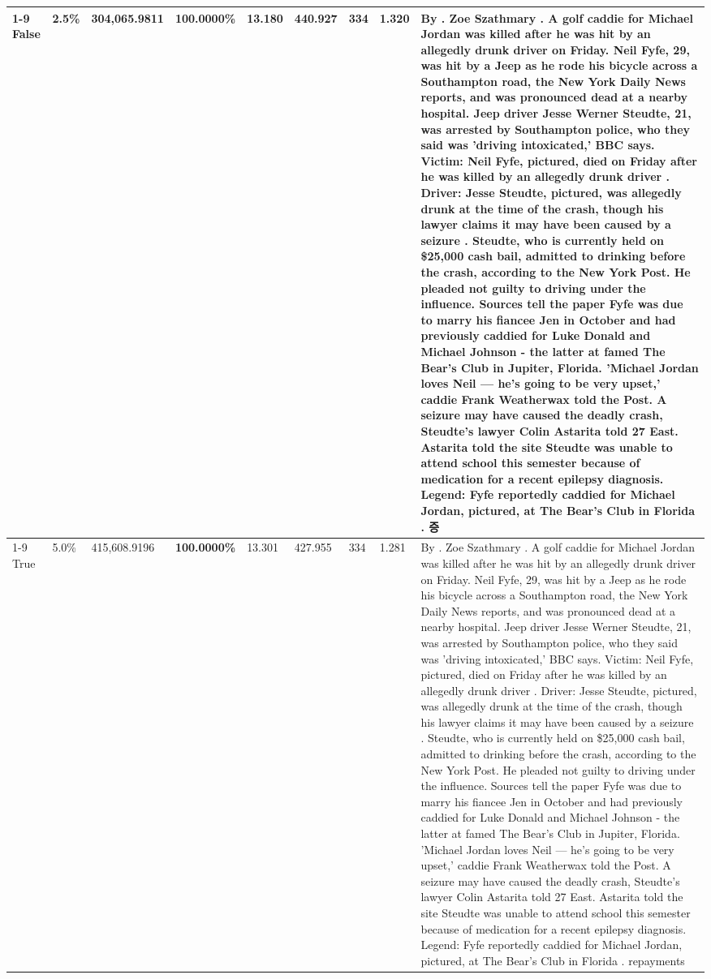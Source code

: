 \begin{table}[H]
\begin{tabular}{lllrlllll}
\cline{1-9}
False & 2.5\% & 304,065.9811 & \bfseries \color{red} 100.0000\% & 13.180 & 440.927 & 334 & 1.320 & By . Zoe Szathmary . A golf caddie for Michael Jordan was killed after he was hit by an allegedly drunk driver on Friday. Neil Fyfe, 29, was hit by a Jeep as he rode his bicycle across a Southampton road, the New York Daily News reports, and was pronounced dead at a nearby hospital. Jeep driver Jesse Werner Steudte, 21, was arrested by Southampton police, who they said was 'driving intoxicated,' BBC says. Victim: Neil Fyfe, pictured, died on Friday after he was killed by an allegedly drunk driver . Driver: Jesse Steudte, pictured, was allegedly drunk at the time of the crash, though his lawyer claims it may have been caused by a seizure . Steudte, who is currently held on \$25,000 cash bail, admitted to drinking before the crash, according to the New York Post. He pleaded not guilty to driving under the influence. Sources tell the paper Fyfe was due to marry his fiancee Jen in October and had previously caddied for Luke Donald and Michael Johnson - the latter at famed The Bear's Club in Jupiter, Florida. 'Michael Jordan loves Neil — he’s going to be very upset,' caddie Frank Weatherwax told the Post. A seizure may have caused the deadly crash, Steudte's lawyer Colin Astarita told 27 East. Astarita told the site Steudte was unable to attend school this semester because of medication for a recent epilepsy diagnosis. Legend: Fyfe reportedly caddied for Michael Jordan, pictured, at The Bear's Club in Florida . 증 \\
\cline{1-9}
True & 5.0\% & 415,608.9196 & \bfseries \color{red} 100.0000\% & 13.301 & 427.955 & 334 & 1.281 & By . Zoe Szathmary . A golf caddie for Michael Jordan was killed after he was hit by an allegedly drunk driver on Friday. Neil Fyfe, 29, was hit by a Jeep as he rode his bicycle across a Southampton road, the New York Daily News reports, and was pronounced dead at a nearby hospital. Jeep driver Jesse Werner Steudte, 21, was arrested by Southampton police, who they said was 'driving intoxicated,' BBC says. Victim: Neil Fyfe, pictured, died on Friday after he was killed by an allegedly drunk driver . Driver: Jesse Steudte, pictured, was allegedly drunk at the time of the crash, though his lawyer claims it may have been caused by a seizure . Steudte, who is currently held on \$25,000 cash bail, admitted to drinking before the crash, according to the New York Post. He pleaded not guilty to driving under the influence. Sources tell the paper Fyfe was due to marry his fiancee Jen in October and had previously caddied for Luke Donald and Michael Johnson - the latter at famed The Bear's Club in Jupiter, Florida. 'Michael Jordan loves Neil — he’s going to be very upset,' caddie Frank Weatherwax told the Post. A seizure may have caused the deadly crash, Steudte's lawyer Colin Astarita told 27 East. Astarita told the site Steudte was unable to attend school this semester because of medication for a recent epilepsy diagnosis. Legend: Fyfe reportedly caddied for Michael Jordan, pictured, at The Bear's Club in Florida . repayments \\

\end{tabular}
\end{table}
